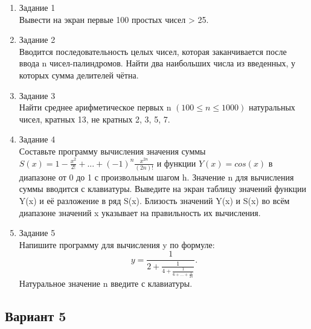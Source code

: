\documentclass[a4paper]{article}
\begin{document}
	\begin{enumerate} 
		\item Задание 1 \\
			Вывести на экран первые 100 простых чисел > 25.\\
		\item Задание 2\\
			Вводится последовательность целых чисел, которая заканчивается после ввода n чисел-палиндромов.  
			Найти два наибольших числа из введенных, у которых сумма делителей чётна.\\
		\item Задание 3 \\
			Найти среднее арифметическое первых n $(100 \le n \le 1000) $ натуральных чисел, кратных 13, не кратных 2, 3, 5, 7.\\
		\item Задание 4 \\
			Составьте программу вычисления значения суммы  $S(x)=1-\frac{x^2}{2!}+...+(-1)^n\frac{x^{2n}}{(2n)!}$
			и функции $Y(x)=cos(x)$ в диапазоне от 0 до 1
			с произвольным шагом h. Значение n для вычисления суммы вводится с клавиатуры. Выведите на экран таблицу значений функции Y(x) и её разложение в ряд S(x). Близость значений Y(x) и S(x) во всём диапазоне
			значений x указывает на правильность их вычисления.\\
		\item Задание 5 \\
			Напишите программу для вычисления y по формуле:
			$$y=\frac{1}{2+\frac{1}{4+\frac{1}{6+...+\frac{1}{2n}}}}.$$
			Натуральное значение n введите с клавиатуры.\\
	\end{enumerate}
	\newpage
	\begin{center}
		\subsection*{Вариант 5}
	\end{center}
\end{document}
